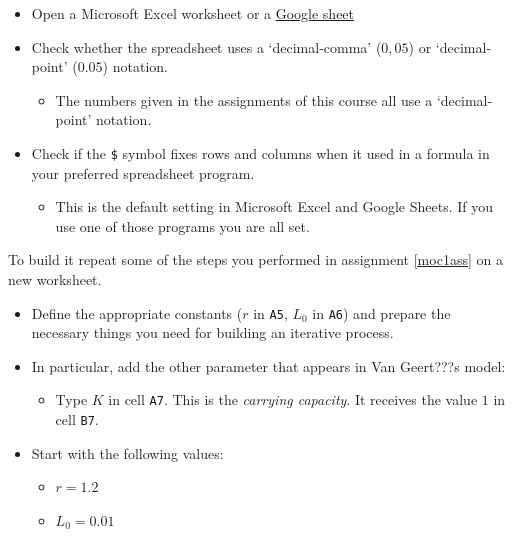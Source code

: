 \documentclass[]{book}
\providecommand{\tightlist}{%
  \setlength{\itemsep}{0pt}\setlength{\parskip}{0pt}}
\begin{document}
\begin{itemize}
\tightlist
\item
  Open a Microsoft Excel worksheet or a
  \href{https://www.google.com/docs/about/}{Google sheet}
\item
  Check whether the spreadsheet uses a `decimal-comma' (\(0,05\)) or
  `decimal-point' (\(0.05\)) notation.

  \begin{itemize}
  \tightlist
  \item
    The numbers given in the assignments of this course all use a
    `decimal-point' notation.
  \end{itemize}
\item
  Check if the \texttt{\$} symbol fixes rows and columns when it used in
  a formula in your preferred spreadsheet program.

  \begin{itemize}
  \tightlist
  \item
    This is the default setting in Microsoft Excel and Google Sheets. If
    you use one of those programs you are all set.

  \end{itemize}
\end{itemize}

To build it repeat some of the steps you performed in assignment
\ref{moc1ass} on a new worksheet.

\begin{itemize}
\tightlist
\item
  Define the appropriate constants (\(r\) in \texttt{A5}, \(L_0\) in
  \texttt{A6}) and prepare the necessary things you need for building an
  iterative process.
\item
  In particular, add the other parameter that appears in Van Geert???s
  model:

  \begin{itemize}
  \tightlist
  \item
    Type \(K\) in cell \texttt{A7}. This is the \emph{carrying
    capacity}. It receives the value \(1\) in cell \texttt{B7}.
  \end{itemize}
\item
  Start with the following values:

  \begin{itemize}
  \tightlist
  \item
    \(r = 1.2\)
  \item
    \(L_0 = 0.01\)
  \end{itemize}
\end{itemize}
\end{document}
